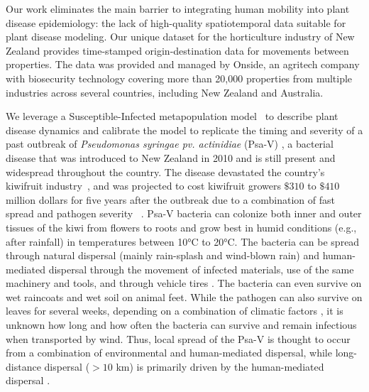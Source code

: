 \documentclass[aps,physrev,reprint,superscriptaddress]{revtex4-1}
\begin{document}
 Our work eliminates the main barrier to integrating human mobility into plant disease epidemiology: the lack of high-quality spatiotemporal data suitable for plant disease modeling. Our unique dataset for the horticulture industry of New Zealand provides time-stamped origin-destination data for movements between properties. The data was provided and managed by Onside, an agritech company with biosecurity technology covering more than 20,000 properties from multiple industries across several countries, including New Zealand and Australia. 


We leverage a Susceptible-Infected metapopulation model~\cite{colizza2008epidemic} to describe plant disease dynamics and calibrate the model to replicate the timing and severity of a past outbreak of \textit{Pseudomonas syringae pv. actinidiae} (Psa-V) \cite{birnie2014lessons}, a bacterial disease that was introduced to New Zealand in 2010 and is still present and widespread throughout the country. The disease devastated the country's kiwifruit industry~\cite{birnie2014lessons,vanneste2017scientific,froud2014relationships}, and was projected to cost kiwifruit growers $\$310$ to $\$410$ million dollars for five years after the outbreak \cite{greer2012costs} due to a combination of fast spread and pathogen severity ~\cite{froud2015review,cameron2014pseudomonas}. Psa-V bacteria can colonize both inner and outer tissues of the kiwi from flowers to roots and grow best in humid conditions (e.g., after rainfall) in temperatures between 10°C to 20°C. The bacteria can be spread through natural dispersal (mainly rain-splash and wind-blown rain) and human-mediated dispersal through the movement of infected materials, use of the same machinery and tools, and through vehicle tires \cite{froud2015review, hardy_pathway_2013}. The bacteria can even survive on wet raincoats and wet soil on animal feet. While the pathogen can also survive on leaves for several weeks, depending on a combination of climatic factors \cite{deng2023survival}, it is unknown how long and how often the bacteria can survive and remain infectious when transported by wind. Thus, local spread of the Psa-V is thought to occur from a combination of environmental and human-mediated dispersal, while long-distance dispersal ($> 10$ km) is primarily driven by the human-mediated dispersal \cite{froud2015review}.  
\end{document}
